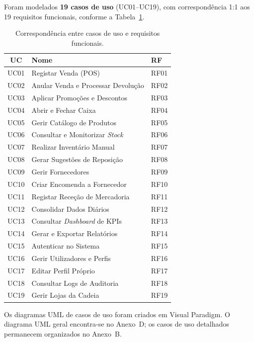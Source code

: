     Foram modelados \textbf{19 casos de uso} (UC01--UC19), com correspondência 1:1 aos 19 requisitos funcionais, conforme a Tabela~\ref{tab:uc_rf_llm}.

    \begin{table}[H]
    \centering
    \small
    \begin{tabular}{|c|l|l|}
    \hline
    \textbf{UC} & \textbf{Nome} & \textbf{RF} \\
    \hline
    UC01 & Registar Venda (POS) & RF01 \\
    UC02 & Anular Venda e Processar Devolução & RF02 \\
    UC03 & Aplicar Promoções e Descontos & RF03 \\
    UC04 & Abrir e Fechar Caixa & RF04 \\
    UC05 & Gerir Catálogo de Produtos & RF05 \\
    UC06 & Consultar e Monitorizar \textit{Stock} & RF06 \\
    UC07 & Realizar Inventário Manual & RF07 \\
    UC08 & Gerar Sugestões de Reposição & RF08 \\
    UC09 & Gerir Fornecedores & RF09 \\
    UC10 & Criar Encomenda a Fornecedor & RF10 \\
    UC11 & Registar Receção de Mercadoria & RF11 \\
    UC12 & Consolidar Dados Diários & RF12 \\
    UC13 & Consultar \textit{Dashboard} de KPIs & RF13 \\
    UC14 & Gerar e Exportar Relatórios & RF14 \\
    UC15 & Autenticar no Sistema & RF15 \\
    UC16 & Gerir Utilizadores e Perfis & RF16 \\
    UC17 & Editar Perfil Próprio & RF17 \\
    UC18 & Consultar Logs de Auditoria & RF18 \\
    UC19 & Gerir Lojas da Cadeia & RF19 \\
    \hline
    \end{tabular}
    \caption{Correspondência entre casos de uso e requisitos funcionais.}
    \label{tab:uc_rf_llm}
    \end{table}

    Os diagramas UML de casos de uso foram criados em Visual Paradigm. O diagrama UML geral encontra-se no Anexo~D; os casos de uso detalhados permanecem organizados no Anexo~B.

